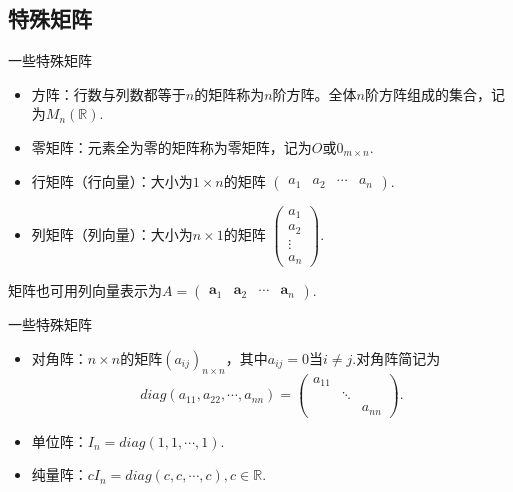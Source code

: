 
\subsection{特殊矩阵} 


\begin{frame}{一些特殊矩阵}

\begin{itemize}
\item 方阵：行数与列数都等于$n$的矩阵称为$n$阶方阵。全体$n$阶方阵组成的集合，记为$M_n(\mathbb{R})$.
\item 零矩阵：元素全为零的矩阵称为零矩阵，记为$O$或$0_{m\times n}$.
\item 行矩阵（行向量）：大小为$1\times n$的矩阵 \(\displaystyle \begin{pmatrix} a_1 & a_2 & \cdots & a_n \end{pmatrix}\).
\item 列矩阵（列向量）：大小为$n\times 1$的矩阵 \(\displaystyle \begin{pmatrix} a_1 \\ a_2 \\ \vdots \\ a_n \end{pmatrix}\).
\end{itemize}
矩阵也可用列向量表示为$A = \begin{pmatrix}
\mathbf{a}_1 & \mathbf{a}_2 & \cdots & \mathbf{a}_n
\end{pmatrix}$.

\end{frame}


\begin{frame}{一些特殊矩阵}

\begin{itemize}
\item 对角阵：$n\times n$的矩阵$(a_{ij})_{n\times n}$，其中$a_{ij} = 0 \text{当$i\neq j$.}$对角阵简记为
$$diag(a_{11},a_{22},\cdots,a_{nn}) = \begin{pmatrix} a_{11} & & \\ & \ddots & \\ & & a_{nn} \end{pmatrix}.$$
\item 单位阵：$I_n = diag(1,1,\cdots,1)$.
\item 纯量阵：$cI_n = diag(c,c,\cdots,c), c \in \mathbb{R}$.
\end{itemize}

\end{frame}

